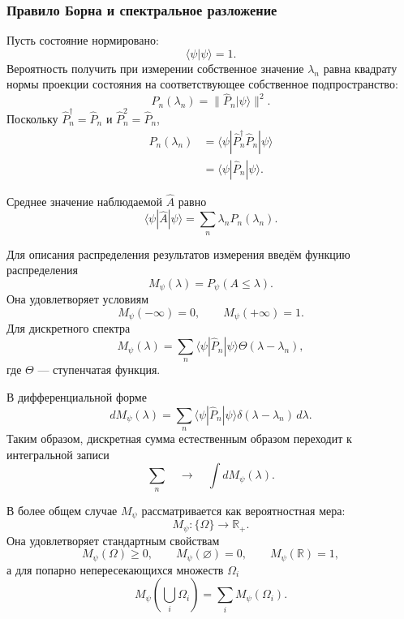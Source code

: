 \documentclass[12pt,a4paper]{article}
\begin{document}
\subsubsection{Правило Борна и спектральное разложение}

Пусть состояние нормировано:
\[
    \langle\psi|\psi\rangle=1.
\]
Вероятность получить при измерении собственное значение $\lambda_n$
равна квадрату нормы проекции состояния на соответствующее собственное
подпространство:
\[
    \boxed{
        P_n(\lambda_n)
        =
        \|\hat P_n|\psi\rangle\|^2
    }.
\]
Поскольку $\hat P_n^\dagger=\hat P_n$ и
$\hat P_n^2=\hat P_n$,
\begin{align*}
    P_n(\lambda_n)
    &=
    \langle\psi|
        \hat P_n^\dagger\hat P_n
    |\psi\rangle \\
    &=
    \boxed{
        \langle\psi|\hat P_n|\psi\rangle
    }.
\end{align*}

Среднее значение наблюдаемой $\hat A$ равно
\[
    \boxed{
    \langle\psi|\hat A|\psi\rangle
    =
    \sum_n
        \lambda_n
        P_n(\lambda_n)
    }.
\]

Для описания распределения результатов измерения введём функцию
распределения
\[
    M_\psi(\lambda)
    =
    P_\psi(A\leq\lambda).
\]
Она удовлетворяет условиям
\[
    \boxed{
        M_\psi(-\infty)=0,
        \qquad
        M_\psi(+\infty)=1
    }.
\]
Для дискретного спектра
\[
    \boxed{
    M_\psi(\lambda)
    =
    \sum_n
        \langle\psi|\hat P_n|\psi\rangle
        \Theta(\lambda-\lambda_n)
    },
\]
где $\Theta$ --- ступенчатая функция.

В дифференциальной форме
\[
    \boxed{
    dM_\psi(\lambda)
    =
    \sum_n
        \langle\psi|\hat P_n|\psi\rangle
        \delta(\lambda-\lambda_n)\,d\lambda
    }.
\]
Таким образом, дискретная сумма естественным образом переходит к
интегральной записи
\[
    \sum_n
    \quad\longrightarrow\quad
    \int dM_\psi(\lambda).
\]

В более общем случае $M_\psi$ рассматривается как вероятностная мера:
\[
    M_\psi:\{\Omega\}\to\mathbb R_+.
\]
Она удовлетворяет стандартным свойствам
\[
    M_\psi(\Omega)\geq0,
    \qquad
    M_\psi(\varnothing)=0,
    \qquad
    M_\psi(\mathbb R)=1,
\]
а для попарно непересекающихся множеств $\Omega_i$
\[
    \boxed{
    M_\psi
    \left(
        \bigcup_i\Omega_i
    \right)
    =
    \sum_i
        M_\psi(\Omega_i)
    }.
\]
\end{document}
